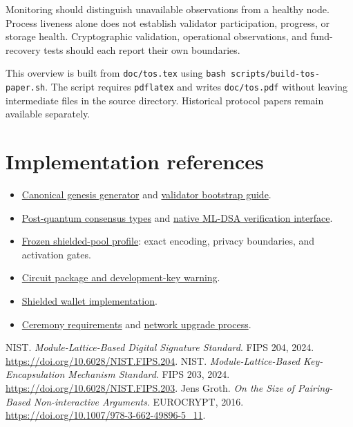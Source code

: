 \documentclass[11pt,a4paper]{article}
\newcommand{\code}[1]{\texttt{#1}}
\newcommand{\repo}[2]{\href{https://github.com/tosnetwork/tos/blob/main/#1}{#2}}
\begin{document}
Monitoring should distinguish unavailable observations from a healthy node.
Process liveness alone does not establish validator participation, progress,
or storage health. Cryptographic validation, operational observations, and
fund-recovery tests should each report their own boundaries.

This overview is built from \code{doc/tos.tex} using
\code{bash scripts/build-tos-paper.sh}. The script requires \code{pdflatex}
and writes \code{doc/tos.pdf} without leaving intermediate files in the
source directory. Historical protocol papers remain available separately.

\section*{Implementation references}
\begin{itemize}
\item \repo{crypto/smartcont/gen-zerostate.fif}{Canonical genesis generator}
and \repo{doc/validator-genesis-bootstrap.md}{validator bootstrap guide}.
\item \repo{crypto/pq/pq-consensus.h}{Post-quantum consensus types} and
\repo{doc/tvm-mldsa44.md}{native ML-DSA verification interface}.
\item \repo{artifacts/shielded-pool/PROFILE.md}{Frozen shielded-pool profile}:
exact encoding, privacy boundaries, and activation gates.
\item \repo{tools/shielded-pool-circuit/README.md}{Circuit package and development-key warning}.
\item \href{https://github.com/tosnetwork/tos/tree/main/tools/shielded-pool-wallet}{Shielded wallet implementation}.
\item \repo{artifacts/shielded-pool/CEREMONY.md}{Ceremony requirements} and
\repo{doc/tos-upgrade-process.md}{network upgrade process}.
\end{itemize}
\begin{thebibliography}{9}
 NIST. \emph{Module-Lattice-Based Digital Signature Standard}.
FIPS 204, 2024. \url{https://doi.org/10.6028/NIST.FIPS.204}.
 NIST. \emph{Module-Lattice-Based Key-Encapsulation Mechanism Standard}.
FIPS 203, 2024. \url{https://doi.org/10.6028/NIST.FIPS.203}.
 Jens Groth. \emph{On the Size of Pairing-Based Non-interactive
Arguments}. EUROCRYPT, 2016.
\url{https://doi.org/10.1007/978-3-662-49896-5_11}.
\end{thebibliography}
\end{document}
